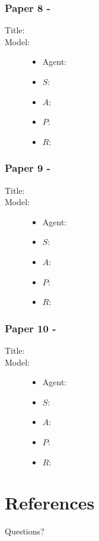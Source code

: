 \documentclass{beamer}
\begin{document}
\begin{frame}
    \frametitle{Paper 8 - }
    \begin{description}
        \item[Title:] \footfullcite{}
        \item[Model:]
        \begin{itemize}
            \item Agent: 
            \item $S$: 
            \item $A$: 
            \item $P$: 
            \item $R$: 
        \end{itemize}
        \item[] 
    \end{description}
\end{frame}

\begin{frame}
    \frametitle{Paper 9 - }
    \begin{description}
        \item[Title:] \footfullcite{}
        \item[Model:]
        \begin{itemize}
            \item Agent: 
            \item $S$: 
            \item $A$: 
            \item $P$: 
            \item $R$: 
        \end{itemize}
        \item[] 
    \end{description}
\end{frame}

\begin{frame}
    \frametitle{Paper 10 - }
    \begin{description}
        \item[Title:] \footfullcite{}
        \item[Model:]
        \begin{itemize}
            \item Agent: 
            \item $S$: 
            \item $A$: 
            \item $P$: 
            \item $R$: 
        \end{itemize}
        \item[] 
    \end{description}
\end{frame}

\section{References}
\frame{\printbibliography}

\begin{frame}
    Questions?
\end{frame}
\end{document}
